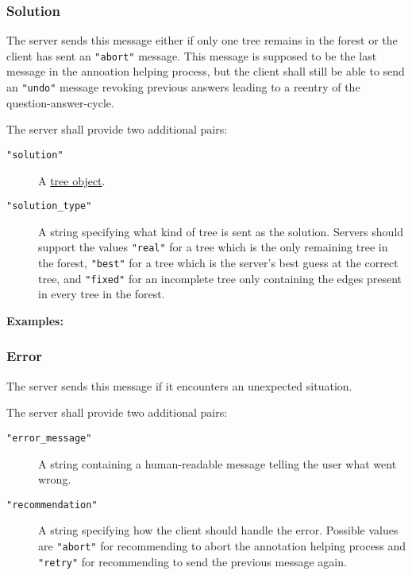 \documentclass{scrartcl}
\newcommand{\jsstring}[1]{\texttt{\color{OrangeRed}"#1"}}
\newcommand{\Examples}{\noindent\textbf{Examples:}}
\begin{document}
\subsubsection{Solution}
\label{ssub:Solution}

The server sends this message either if only one tree remains in the forest or the client has sent an \jsstring{abort} message.
This message is supposed to be the last message in the annoation helping process, but the client shall still be able to send an \jsstring{undo} message revoking previous answers leading to a reentry of the question-answer-cycle.

The server shall provide two additional pairs:
\begin{description}
    \item[\jsstring{solution}] A \hyperref[ssub:Tree object]{tree object}.
    \item[\jsstring{solution\_type}] A string specifying what kind of tree is sent as the solution.
        Servers should support the values \jsstring{real} for a tree which is the only remaining tree in the forest, \jsstring{best} for a tree which is the server’s best guess at the correct tree, and \jsstring{fixed} for an incomplete tree only containing the edges present in every tree in the forest.
\end{description}

\Examples



\subsubsection{Error}
\label{ssub:Error}

The server sends this message if it encounters an unexpected situation.

The server shall provide two additional pairs:
\begin{description}
    \item[\jsstring{error\_message}] A string containing a human-readable message telling the user what went wrong.
    \item[\jsstring{recommendation}] A string specifying how the client should handle the error.
        Possible values are \jsstring{abort} for recommending to abort the annotation helping process and \jsstring{retry} for recommending to send the previous message again.
\end{description}
\end{document}
